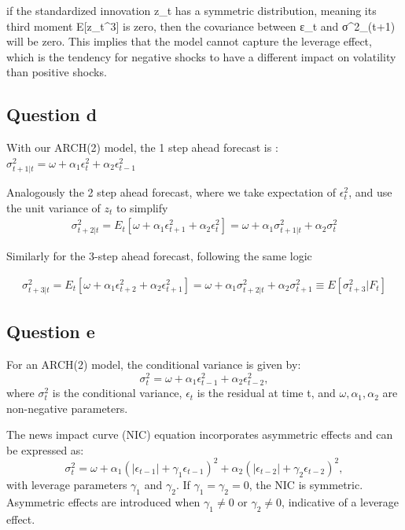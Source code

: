 \documentclass{article}
\begin{document}
if the standardized innovation z_t has a symmetric distribution, meaning its third moment E[z_t^3] is zero, then the covariance between ε_t and σ^2_(t+1) will be zero. This implies that the model cannot capture the leverage effect, which is the tendency for negative shocks to have a different impact on volatility than positive shocks.

\subsection*{Question d}

With our ARCH(2) model, the 1 step ahead forecast is : $\sigma^2_{t+1 | t}  = \omega + \alpha_1  \epsilon^2_{t}  + \alpha_2  \epsilon^2_{t-1}$

Analogously the 2 step ahead forecast, where we take expectation of $\epsilon_t^2$, and use the unit variance of $z_{t}$ to simplify 
\begin{align*}
\sigma^2_{t+2 | t}  = E_t \left[  \omega + \alpha_1  \epsilon^2_{t+1}  + \alpha_2  \epsilon^2_{t}  \right] =   \omega + \alpha_1  \sigma^2_{t+1|t}  + \alpha_2  \sigma^2_{t}  
\end{align*}

Similarly for the 3-step ahead forecast, following the same logic

 \begin{align*}
 	\sigma^2_{t+3 | t} = E_t \left[  \omega + \alpha_1  \epsilon^2_{t+2}  + \alpha_2  \epsilon^2_{t+1}  \right] =   \omega + \alpha_1  \sigma^2_{t+2|t}  + \alpha_2  \sigma^2_{t+1} \equiv E \left[ \sigma^2_{t+3} | F_{t} \right] 
 \end{align*}

\subsection*{Question e}


For an ARCH(2) model, the conditional variance is given by:
\begin{equation}
\sigma_t^2 = \omega + \alpha_1 \epsilon_{t-1}^2 + \alpha_2 \epsilon_{t-2}^2,
\end{equation}
where \( \sigma_t^2 \) is the conditional variance, \( \epsilon_t \) is the residual at time t, and \( \omega, \alpha_1, \alpha_2 \) are non-negative parameters.

The news impact curve (NIC) equation incorporates asymmetric effects and can be expressed as:
\begin{equation}
\sigma_t^2 = \omega + \alpha_1 (|\epsilon_{t-1}| + \gamma_1 \epsilon_{t-1})^2 + \alpha_2 (|\epsilon_{t-2}| + \gamma_2 \epsilon_{t-2})^2,
\end{equation}
with leverage parameters \( \gamma_1 \) and \( \gamma_2 \). If \( \gamma_1 = \gamma_2 = 0 \), the NIC is symmetric. Asymmetric effects are introduced when \( \gamma_1 \neq 0 \) or \( \gamma_2 \neq 0 \), indicative of a leverage effect.
\end{document}
